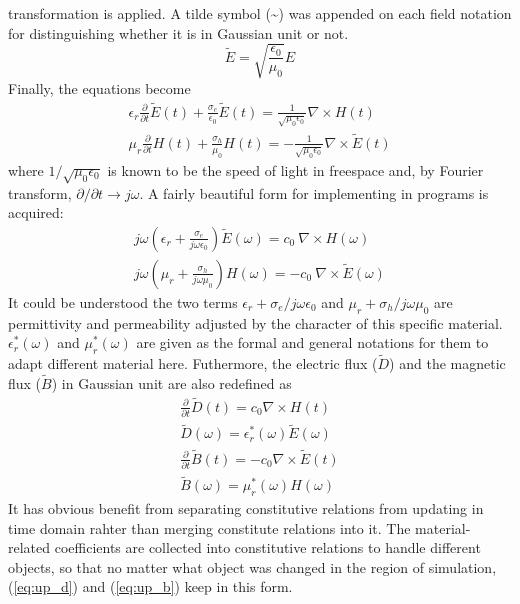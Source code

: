 transformation is applied. A tilde symbol (\textasciitilde{}) was appended on each field notation for distinguishing
whether it is in Gaussian unit or not.
\label{eq:gaussian_unit}
\begin{equation}
  {\displaystyle\widetilde{E} = \sqrt{\frac{\epsilon_0}{\mu_0}}E}
\end{equation}
Finally, the equations become
\begin{gather}\label{eq:coordinate_transform}
  \epsilon_r\frac{\partial}{\partial t}\widetilde{E}(t) + \frac{\sigma_e}{\epsilon_0}\widetilde{E}(t) = \frac{1}{\sqrt{\mu_0\epsilon_0}}\nabla\times H(t)\\
  \mu_r\frac{\partial}{\partial t} H(t) + \frac{\sigma_h}{\mu_0}H(t) = - \frac{1}{\sqrt{\mu_0\epsilon_0}}\nabla\times\widetilde{E}(t)
\end{gather}
where $1/\sqrt{\mu_0\epsilon_0}$ is known to be the speed of light in freespace and, by Fourier transform,
$\partial/\partial t \rightarrow j\omega$. A fairly beautiful form for implementing in programs is acquired:
\begin{gather}
  j\omega\left(\epsilon_r + \frac{\sigma_e}{j\omega\epsilon_0}\right)\widetilde{E}(\omega) = c_0\ \nabla\times H(\omega)\\
  j\omega\left(\mu_r + \frac{\sigma_h}{j\omega\mu_0}\right)H(\omega) = - c_0\ \nabla\times\widetilde{E}(\omega)
\end{gather}
It could be understood the two terms $\epsilon_r + \sigma_e/j\omega\epsilon_0$ and $\mu_r + \sigma_h/j\omega\mu_0$ are
permittivity and permeability adjusted by the character of this specific material. $\epsilon_r^*(\omega)$ and
$\mu_r^*(\omega)$ are given as the formal and general notations for them to adapt different material here. Futhermore,
the electric flux ($\widetilde{D}$) and the magnetic flux ($\widetilde{B}$) in Gaussian unit are also redefined as
\begin{gather}
  \frac{\partial}{\partial t}\widetilde{D}(t) = c_0\nabla\times H(t)\label{eq:up_d}\\
  \widetilde{D}(\omega) = \epsilon_r^*(\omega)\widetilde{E}(\omega)\label{eq:cr_d}\\
  \frac{\partial}{\partial t}\widetilde{B}(t) = -c_0\nabla\times\widetilde{E}(t)\label{eq:up_b}\\
  \widetilde{B}(\omega) = \mu_r^*(\omega)H(\omega)\label{eq:cr_b}
\end{gather}
It has obvious benefit from separating constitutive relations from updating in time domain rahter than merging
constitute relations into it. The material-related coefficients are collected into constitutive relations to handle
different objects, so that no matter what object was changed in the region of simulation, (\ref{eq:up_d}) and
(\ref{eq:up_b}) keep in this form.

